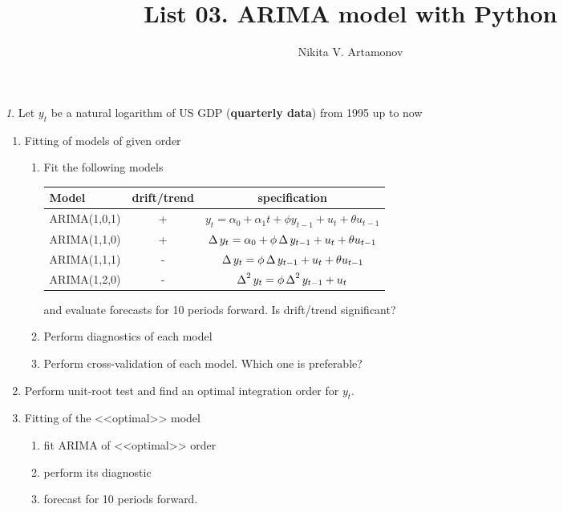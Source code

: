 \documentclass[12pt]{article}
\title{List 03. ARIMA model with Python}
\author{Nikita V. Artamonov}
\theoremstyle{remark}
\newtheorem{exercise}{}[section]
\begin{document}
\maketitle



\begin{exercise}
Let \(y_t\) be a natural logarithm of  US GDP (\textbf{quarterly data}) from 1995 up to now
\begin{enumerate}
	\item Fitting of models of given order
	\begin{enumerate}
		\item Fit the following models
		\begin{center}\small
			\begin{tabular}{l|c|c}
				Model & drift/trend  & specification\\ \hline
				ARIMA(1,0,1) & + & \(y_t=\alpha_0+\alpha_1t+\phi y_{t-1}+u_t+\theta u_{t-1}\)\\
				ARIMA(1,1,0) & + & \(\operatorname{\Delta} y_t=\alpha_0+\phi\operatorname{\Delta} y_{t-1}+u_t+\theta u_{t-1}\)\\
				ARIMA(1,1,1) & - & \(\operatorname{\Delta} y_t=\phi\operatorname{\Delta} y_{t-1}+u_t+\theta u_{t-1}\) \\
				ARIMA(1,2,0) & - & \(\operatorname{\Delta}^2 y_t=\phi\operatorname{\Delta}^2 y_{t-1}+u_t\)\\ \hline
			\end{tabular}
		\end{center} 
		and evaluate forecasts for 10 periods forward. Is drift/trend significant?
		\item Perform diagnostics of each model
		\item Perform cross-validation of each model. Which one is preferable?
	\end{enumerate}
	\item Perform unit-root test and find an optimal integration order for  \(y_t\). 
	\item Fitting of the <<optimal>> model
	\begin{enumerate}
		\item fit ARIMA of <<optimal>> order
		\item perform its diagnostic
		\item forecast for 10 periods forward.
	\end{enumerate}
\end{enumerate}
\end{exercise}
\end{document}
